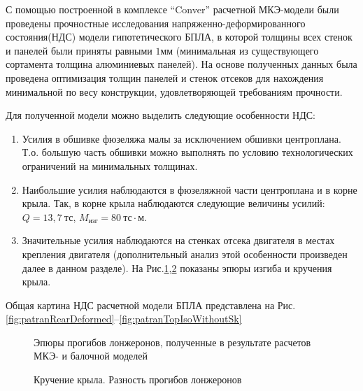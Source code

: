 \label{sec:ndsResults}

С помощью построенной в комплексе ``Conver'' расчетной МКЭ-модели были проведены прочностные исследования напряженно-деформированного состояния(НДС) модели гипотетического БПЛА, в которой толщины всех стенок и панелей были приняты равными $1\text{мм}$ (минимальная из существующего сортамента толщина алюминиевых панелей). На основе полученных данных была проведена оптимизация толщин панелей и стенок отсеков для нахождения минимальной по весу конструкции, удовлетворяющей требованиям прочности.

Для полученной модели можно выделить следующие особенности НДС:

\begin{enumerate}
\item Усилия в обшивке фюзеляжа малы за исключением обшивки центроплана. Т.о. большую часть обшивки можно выполнять по условию технологических ограничений на минимальных толщинах.
\item Наибольшие усилия наблюдаются в фюзеляжной части центроплана и в корне крыла. Так, в корне крыла наблюдаются следующие величины усилий: $Q = 13,7~\text{тс}$, $M_\text{изг} = 80~\text{тс}\cdot\text{м}$. 
\item Значительные усилия наблюдаются на стенках отсека двигателя в местах крепления двигателя (дополнительный анализ этой особенности произведен далее в данном разделе). На Рис.\ref{fig:WingDeformation3},\ref{fig:WingRotating} показаны эпюры изгиба и кручения крыла. 
\end{enumerate}  

Общая картина НДС расчетной модели БПЛА представлена на Рис.\ref{fig:patranRearDeformed}--\ref{fig:patranTopIsoWithoutSk}


\begin{figure}[H]
\centering

\captionsetup{justification=centering}
\def\svgwidth{0.9\textwidth}

\caption{Эпюры прогибов лонжеронов, полученные в результате расчетов МКЭ- и балочной моделей}
\label{fig:WingDeformation3}
\end{figure}

\begin{figure}[H]
\centering
\def\svgwidth{0.9\textwidth}

\caption{Кручение крыла. Разность прогибов лонжеронов}
\label{fig:WingRotating}
\end{figure}


